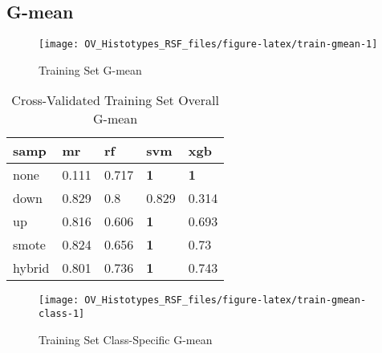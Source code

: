\documentclass[
]{report}
\begin{document}
\hypertarget{g-mean}{%
\subsection{G-mean}\label{g-mean}}

\begin{figure}[H]

{\centering \texttt{[image: OV\_Histotypes\_RSF\_files/figure-latex/train-gmean-1]} 

}

\caption{Training Set G-mean}\label{fig:train-gmean}
\end{figure}

\begin{table}

\caption{\label{tab:train-gmean-table}Cross-Validated Training Set Overall G-mean}
\centering
\begin{tabular}[t]{l|l|l|l|l}
\hline
samp & mr & rf & svm & xgb\\
\hline
none & 0.111 & 0.717 & \textbf{1} & \textbf{1}\\
\hline
down & 0.829 & 0.8 & 0.829 & 0.314\\
\hline
up & 0.816 & 0.606 & \textbf{1} & 0.693\\
\hline
smote & 0.824 & 0.656 & \textbf{1} & 0.73\\
\hline
hybrid & 0.801 & 0.736 & \textbf{1} & 0.743\\
\hline
\end{tabular}
\end{table}

\begin{figure}[H]

{\centering \texttt{[image: OV\_Histotypes\_RSF\_files/figure-latex/train-gmean-class-1]} 

}

\caption{Training Set Class-Specific G-mean}\label{fig:train-gmean-class}
\end{figure}
\end{document}
